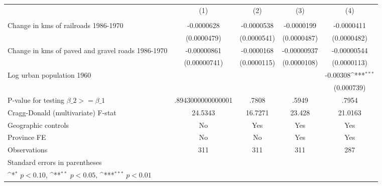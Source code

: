 {
\def\sym#1{\ifmmode^{#1}\else\(^{#1}\)\fi}
\begin{tabular}{l*{4}{c}}
\hline\hline
                &\multicolumn{1}{c}{(1)}&\multicolumn{1}{c}{(2)}&\multicolumn{1}{c}{(3)}&\multicolumn{1}{c}{(4)}\\
                &\multicolumn{1}{c}{}&\multicolumn{1}{c}{}&\multicolumn{1}{c}{}&\multicolumn{1}{c}{}\\
\hline
Change in kms of railroads 1986-1970&-0.0000628         &-0.0000538         &-0.0000199         &-0.0000411         \\
                &(0.0000479)         &(0.0000541)         &(0.0000487)         &(0.0000482)         \\
[1em]
Change in kms of paved and gravel roads 1986-1970&-0.00000861         &-0.0000168         &-0.00000937         &-0.00000544         \\
                &(0.00000741)         &(0.0000115)         &(0.0000108)         &(0.0000113)         \\
[1em]
Log urban population 1960&                  &                  &                  & -0.00308\sym{***}\\
                &                  &                  &                  &(0.000739)         \\
\hline
P-value for testing $\beta\_{2} >= \beta\_{1}$&.8943000000000001         &    .7808         &    .5949         &    .7954         \\
Cragg-Donald (multivariate) F-stat&  24.5343         &  16.7271         &   23.428         &  21.0163         \\
Geographic controls&       No         &      Yes         &      Yes         &      Yes         \\
Province FE     &       No         &       No         &      Yes         &      Yes         \\
Observations    &      311         &      311         &      311         &      287         \\
\hline\hline
\multicolumn{5}{l}{\footnotesize Standard errors in parentheses}\\
\multicolumn{5}{l}{\footnotesize \sym{*} \(p<0.10\), \sym{**} \(p<0.05\), \sym{***} \(p<0.01\)}\\
\end{tabular}
}
